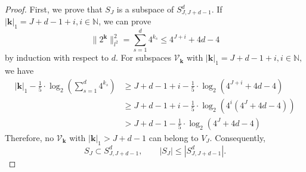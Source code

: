 \begin{proof}
First, we prove that $S_J$ is a subspace of $S_{J,J+d-1}^d$.
If $|\mathbf{k}|_{1}=J+d-1+i, i  \in \mathbb{N}$, we can prove 
$$
\|2^{\mathbf{k}}\|_{l^2}^2=\sum_{s=1}^{d} 4^{k_{s}}\le 4^{J+i}+4 d-4
$$
 by induction with respect to $d$. 
For subspaces $\mathcal V_{\mathbf{k}}$ with $|\mathbf{k}|_{1}=J+d-1+i, i \in \mathbb{N},$ we have
\begin{equation}
\begin{split}
|\mathbf{k}|_{1}-\frac{1}{5} \cdot \log _{2}\left(\sum_{s=1}^{d} 4^{k_{s}}\right) & \geq J+d-1+i-\frac{1}{5} \cdot \log _{2}\left(4^{J+i}+4 d-4\right) \\
& \geq J+d-1+i-\frac{1}{5} \cdot \log _{2}\left(4^{i}\left(4^{J}+4 d-4\right)\right) \\
&>J+d-1-\frac{1}{5} \cdot \log _{2}\left(4^{J}+4 d-4\right)
\end{split}
\end{equation}
Therefore, no $\mathcal V_{\mathbf{k}}$ with $|\mathbf{k}|_{1}>J+d-1$ can belong to $V_J .$ Consequently,  
\begin{equation}
S_J\subset S_{J,J+d-1}^d,\qquad \left|S_J\right| \leq\left|S_{J,J+d-1}^d\right|.
\end{equation}


\end{proof}
